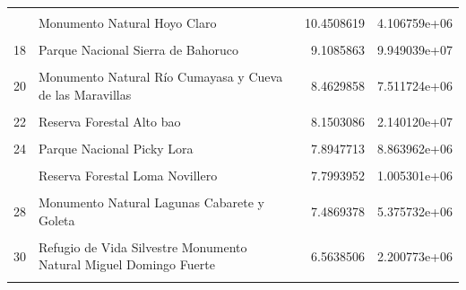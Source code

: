 \documentclass[10pt,landscape,a3paper]{article}
\begin{document}
\begin{longtable}[t]{llrr}
\cellcolor{lightgray}{15} & \cellcolor{lightgray}{Parque Nacional Cabo Cabrón} & \cellcolor{lightgray}{10.8114248} & \cellcolor{lightgray}{3.851405e+06}\\
\addlinespace
16 & Monumento Natural Hoyo Claro & 10.4508619 & 4.106759e+06\\
\cellcolor{lightgray}{17} & \cellcolor{lightgray}{Parque Nacional Manolo Tavarez Justo} & \cellcolor{lightgray}{9.8789370} & \cellcolor{lightgray}{3.474684e+07}\\
18 & Parque Nacional Sierra de Bahoruco & 9.1085863 & 9.949039e+07\\
\cellcolor{lightgray}{19} & \cellcolor{lightgray}{Reserva Forestal Las Matas} & \cellcolor{lightgray}{8.9687134} & \cellcolor{lightgray}{4.285024e+06}\\
20 & Monumento Natural Río Cumayasa y Cueva de las Maravillas & 8.4629858 & 7.511724e+06\\
\addlinespace
\cellcolor{lightgray}{21} & \cellcolor{lightgray}{Monumento Natural Salto El Limón} & \cellcolor{lightgray}{8.3638311} & \cellcolor{lightgray}{1.377940e+06}\\
22 & Reserva Forestal Alto bao & 8.1503086 & 2.140120e+07\\
\cellcolor{lightgray}{23} & \cellcolor{lightgray}{Monumento Natural Salto Grande} & \cellcolor{lightgray}{7.9794657} & \cellcolor{lightgray}{1.177706e+06}\\
24 & Parque Nacional Picky Lora & 7.8947713 & 8.863962e+06\\
\cellcolor{lightgray}{25} & \cellcolor{lightgray}{Santuario De Mamiferos Marinos Estero Hondo} & \cellcolor{lightgray}{7.8195251} & \cellcolor{lightgray}{2.544674e+06}\\
\addlinespace
26 & Reserva Forestal Loma Novillero & 7.7993952 & 1.005301e+06\\
\cellcolor{lightgray}{27} & \cellcolor{lightgray}{Reserva Forestal Río Cana} & \cellcolor{lightgray}{7.4888845} & \cellcolor{lightgray}{1.946716e+07}\\
28 & Monumento Natural Lagunas Cabarete y Goleta & 7.4869378 & 5.375732e+06\\
\cellcolor{lightgray}{29} & \cellcolor{lightgray}{Monumento Natural Salto de La Damajagua} & \cellcolor{lightgray}{6.9006781} & \cellcolor{lightgray}{3.813125e+05}\\
30 & Refugio de Vida Silvestre Monumento Natural Miguel Domingo Fuerte & 6.5638506 & 2.200773e+06\\
\addlinespace
\cellcolor{lightgray}{31} & \cellcolor{lightgray}{Via Panoramica Carretera Nagua - Sánchez} & \cellcolor{lightgray}{6.5527937} & \cellcolor{lightgray}{1.103949e+06}\\

\end{longtable}
\end{document}
